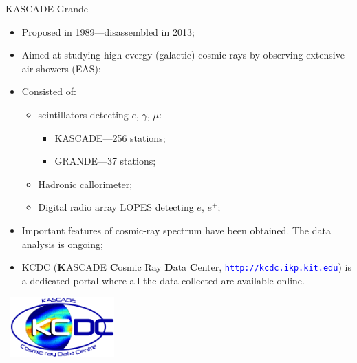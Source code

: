 \begin{frame}{KASCADE-Grande}
\begin{itemize}
  \item Proposed in 1989---disassembled in 2013;
  \item Aimed at studying
  high-evergy (galactic) cosmic rays by observing extensive air showers (EAS);
  \item Consisted of:
  \begin{itemize}
    \item scintillators detecting $e$, $\gamma$, $\mu$:
    \begin{itemize}
    \item KASCADE---256 stations;
    \item GRANDE---37 stations;
    \end{itemize}
    \item Hadronic callorimeter;
    \item Digital radio array LOPES detecting $e$, $e^{+}$;
  \end{itemize}
  \item Important features of cosmic-ray spectrum have been obtained. The data analysis is ongoing;
  \item KCDC (\textbf{K}ASCADE \textbf{C}osmic Ray \textbf{D}ata \textbf{C}enter, \textcolor{blue}{\texttt{http://kcdc.ikp.kit.edu}}) is a dedicated portal where all the data collected are available online. %
\end{itemize}

\parbox[t][0pt]{0pt}{
  \vspace{-0.63\textheight}
  ~\hspace{0.68\textwidth}\includegraphics[width=0.3\textwidth]{pics/KCDC-Logo.png}
}
\end{frame}

